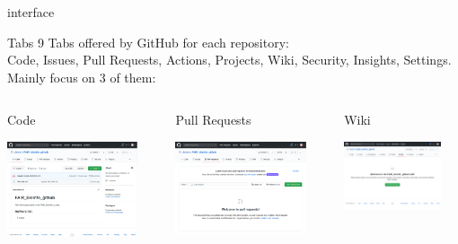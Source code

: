 \begin{frame}{ interface}
\begin{exampleblock}{Tabs}
9 Tabs offered by GitHub for each repository: \\
Code, Issues, Pull Requests, Actions, Projects, Wiki, Security, Insights, Settings.\\
Mainly focus on 3 of them:
\end{exampleblock}
\begin{columns}
\begin{column}{0.38\textwidth}
\begin{exampleblock}{Code}
\begin{center}
    \includegraphics[height=2.8cm]{05_history/Images/FAIR_github_CodeTab.png}
\end{center}
\end{exampleblock}
\end{column}
\begin{column}{0.38\textwidth}
\begin{exampleblock}{Pull Requests}
\begin{center}
    \includegraphics[height=2.7cm]{05_history/Images/FAIR_github_PullTab.png}
\end{center}
\end{exampleblock}
\end{column}
\begin{column}{0.2\textwidth}
\begin{exampleblock}{Wiki}
\begin{center}
    \includegraphics[height=2cm]{05_history/Images/FAIR_github_WikiTab.png}
\end{center}
\end{exampleblock}
\end{column}
\end{columns}
\end{frame}
